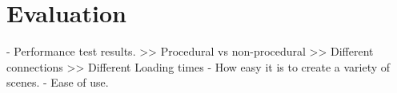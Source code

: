 \chapter{Evaluation}

 - Performance test results.
    >> Procedural vs non-procedural
	>> Different connections
	>> Different Loading times
 - How easy it is to create a variety of scenes.
 - Ease of use.
